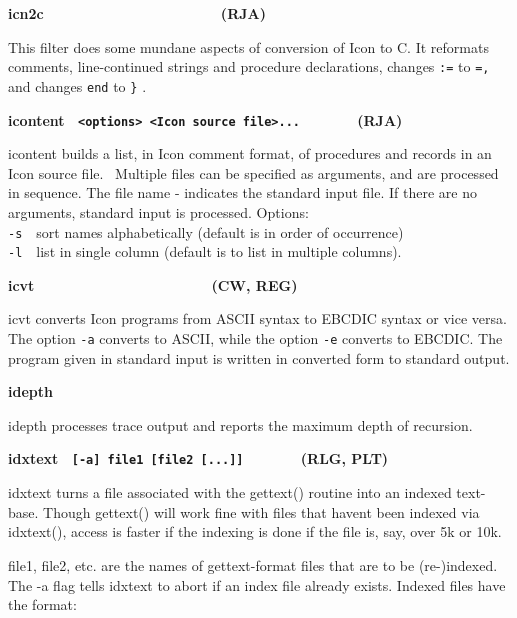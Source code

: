 {{\sffamily\bfseries
icn2c\ \ \ \ \ \ \ \ \ \ \ \ \ \ \ \ \ \ \ \ \ \ (RJA)}

This filter does some mundane aspects of conversion of Icon to C. It
reformats comments, line-continued strings and procedure declarations,
changes \texttt{:=} to \texttt{=,} and changes \texttt{end} to
\texttt{{\textquotedbl}\}{\textquotedbl}} . 

{\sffamily\bfseries
icontent \ \texttt{\textmd{{\textless}options{\textgreater}
{\textless}Icon source file{\textgreater}...\ \ \ \ \ \ \ \ }}(RJA)}

\textsf{icontent} builds a list, in Icon comment format, of procedures
and records in an Icon source file. \ Multiple files can be specified
as arguments, and are processed in sequence. The file name
{\textquotedbl}-{\textquotedbl} indicates the standard input file. If
there are no arguments, standard input is processed. Options:\\
\texttt{{}-s}\ \ sort names alphabetically (default is in order of
occurrence)\\
\texttt{{}-l}\ \ list in single column (default is to list in multiple
columns).

{\sffamily\bfseries
icvt\ \ \ \ \ \ \ \ \ \ \ \ \ \ \ \ \ \ \ \  \ \ (CW, REG)}

\textsf{icvt} converts Icon programs from ASCII syntax to
EBCDIC syntax or vice versa. The option \texttt{{}-a}
converts to ASCII, while the option \texttt{{}-e} converts to EBCDIC.
The program given in standard input is written in converted form to
standard output. 

{\sffamily\bfseries
idepth\ \ \ \ \ \ \ \ \ \ \ \ \ \ \ \ \ \ \ \ }

\textsf{idepth} processes trace output and reports the maximum depth of
recursion. 

{\sffamily\bfseries
idxtext \ \texttt{\textmd{[-a] file1 [file2 [...]]\ \ \ \ \ \ \ \ 
}}(RLG, PLT)}

\textsf{idxtext} turns a file associated with the \textsf{gettext()}
routine into an indexed text-base. Though \textsf{gettext()} will work
fine with files that haven{\textquotesingle}t been indexed via
\textsf{idxtext()}, access is faster if the indexing is done if the
file is, say, over 5k or 10k.

\textsf{file1, file2}, etc. are the names of \textsf{gettext}{}-format
files that are to be (re-)indexed. The \textsf{{}-a} flag tells
\textsf{idxtext} to abort if an index file already exists. Indexed
files have the format:

}
